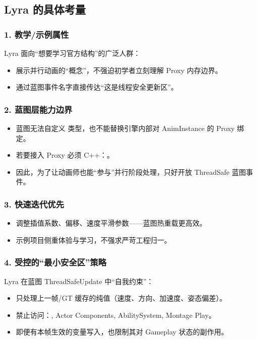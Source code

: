 \documentclass[10pt,openright,oneside,CJKmath]{MyBook}
\begin{document}
\subsection{Lyra 的具体考量}
\subsubsection{1. 教学/示例属性}
Lyra 面向“想要学习官方结构”的广泛人群：
\begin{itemize}
  \item 展示并行动画的“概念”，不强迫初学者立刻理解 Proxy 内存边界。
  \item 通过蓝图事件名字直接传达“这是线程安全更新区”。
\end{itemize}

\subsubsection{2. 蓝图层能力边界}
\begin{itemize}
  \item 蓝图无法自定义  类型，也不能替换引擎内部对 AnimInstance 的 Proxy 绑定。
  \item 若要接入 Proxy 必须 C++：。
  \item 因此，为了让动画师也能“参与”并行阶段处理，只好开放 ThreadSafe 蓝图事件。
\end{itemize}

\subsubsection{3. 快速迭代优先}
\begin{itemize}
  \item 调整插值系数、偏移、速度平滑参数——蓝图热重载更高效。
  \item 示例项目侧重体验与学习，不强求严苛工程归一。
\end{itemize}

\subsubsection{4. 受控的“最小安全区”策略}
Lyra 在蓝图 ThreadSafeUpdate 中“自我约束”：
\begin{itemize}
  \item 只处理上一帧/GT 缓存的纯值（速度、方向、加速度、姿态偏差）。
  \item 禁止访问：, Actor Components, AbilitySystem, Montage Play。
  \item 即便有本帧生效的变量写入，也限制其对 Gameplay 状态的副作用。
\end{itemize}
\end{document}
